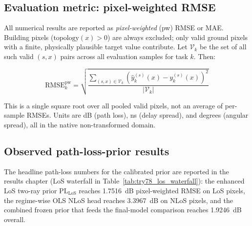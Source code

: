 \subsection{Evaluation metric: pixel-weighted RMSE}

\label{sec:pw_metric}

All numerical results are reported as \emph{pixel-weighted} (pw) RMSE or MAE.
Building pixels ($\mathrm{topology}(x) > 0$) are always excluded; only valid
ground pixels with a finite, physically plausible target value contribute.
Let $\mathcal{V}_k$ be the set of all such valid $(s, x)$ pairs across all
evaluation samples for task $k$. Then:

\begin{equation}
\mathrm{RMSE}^{\mathrm{pw}}_k
=
\sqrt{
  \frac{\displaystyle\sum_{(s,x)\in\mathcal{V}_k}
  \left(\hat{y}_k^{(s)}(x) - y_k^{(s)}(x)\right)^2}
  {\displaystyle|\mathcal{V}_k|}
}
\label{eq:rmse_pw_v2}
\end{equation}

This is a single square root over all pooled valid pixels, not an average of
per-sample RMSEs. Units are dB (path loss), ns (delay spread), and
degrees (angular spread), all in the native non-transformed domain.

\subsection{Observed path-loss-prior results}

The headline path-loss numbers for the calibrated prior are reported in the
results chapter (LoS waterfall in Table~\ref{tab:try78_los_waterfall}): the
enhanced LoS two-ray prior $\mathrm{PL}_{\mathrm{LoS}}$ reaches
\SI{1.7516}{dB}
pixel-weighted RMSE on LoS pixels, the regime-wise OLS NLoS head reaches
\SI{3.3967}{dB} on NLoS pixels, and the combined frozen prior that feeds
the final-model comparison reaches \SI{1.9246}{dB} overall.

